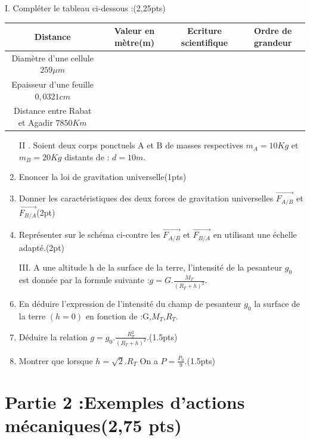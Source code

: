 \documentclass[12pt]{article}
\begin{document}
	 I. Compléter le tableau ci-dessous :\dotfill(2,25pts)
\begin{center}
\begin{tabular}{ | c | c | c | c | }
	\hline
			Distance		& Valeur en mètre(m) & Ecriture scientifique &Ordre de grandeur  \\\hline 
Diamètre d’une cellule $259\mu m$				    & \dotfill        &\dotfill &\dotfill \\\hline  
	Epaisseur d’une feuille $0,0321cm$  & \dotfill& \dotfill  & \dotfill\\\hline  
	\makecell{Distance entre \\Rabat et Agadir $7850 Km$} & \dotfill & \dotfill &\dotfill \\\hline  
\end{tabular}
\end{center}
 \begin{enumerate}

\item[II]. Soient deux corps ponctuels A et B de masses respectives $m_A = 10Kg$ et $m_B=20Kg$
distants de : $d =10m$.

\item Enoncer la loi de gravitation universelle\dotfill(1pts)
\item Donner les caractéristiques des deux forces de gravitation universelles               $\vec{F_{A/B}}$ et $\vec{F_{B/A}}$\dotfill(2pt)
\item Représenter sur le schéma ci-contre les  $\vec{F_{A/B}}$ et $\vec{F_{B/A}}$ en utilisant une échelle adapté.\dotfill(2pt)
\item[III.] A une altitude h de la surface de la terre, l’intensité de la pesanteur $g_0$ est donnée par la formule suivante :$g = G.\frac{M_T}{(R_T + h)^2}$.

\item En déduire l’expression de l’intensité du champ de pesanteur
$g_0$ la surface de la terre $(h=0)$ en fonction de :G,$M_T$,$R_T$.

\item Déduire la relation $g=g_0.\frac{R_T^2}{(R_T + h)^2}$.\dotfill(1.5pts)
\item Montrer que lorsque $h = \sqrt{2}.R_T$ On a $P=\frac{P_0}{9}$.\dotfill(1.5pts)
 \end{enumerate}



 \section*{Partie 2 :Exemples d’actions mécaniques\dotfill(2,75 pts)}
\end{document}
